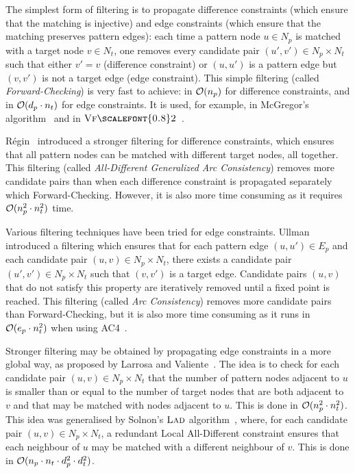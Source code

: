 \documentclass{llncs}
\newcommand{\VFtwo}{$\textsc{Vf{\scalefont{0.8}2}}$\xspace}
\newcommand{\LAD}{$\textsc{Lad}$\xspace}
\begin{document}
The simplest form of filtering is to propagate difference constraints (which ensure that the
matching is injective) and edge constraints (which ensure that the matching preserves pattern
edges): each time a pattern node $u\in N_p$ is matched with a target node $v\in N_t$, one removes
every candidate pair $(u',v')\in N_p\times N_t$ such that either $v'=v$ (difference constraint) or
$(u,u')$ is a pattern edge but $(v,v')$ is not a target edge (edge constraint). This simple
filtering (called \emph{Forward-Checking}) is very fast to achieve: in ${\cal O}(n_p)$ for
difference constraints, and in ${\cal O}(d_p\cdot n_t)$ for edge constraints. It is used, for
example, in McGregor's algorithm~\cite{mcgregor79} and in \VFtwo{}~\cite{Cordella:2004}.

R\'egin~\cite{regin} introduced a stronger filtering for difference constraints, which ensures that
all pattern nodes can be matched with different target nodes, all together. This filtering (called
\emph{All-Different Generalized Arc Consistency}) removes more candidate pairs than when each
difference constraint is propagated separately which Forward-Checking. However, it is also more time
consuming as it requires ${\cal O}(n_p^2\cdot n_t^2)$ time.

Various filtering techniques have been tried for edge constraints. Ullman~\cite{ullman} introduced a
filtering which ensures that for each pattern edge $(u,u')\in E_p$ and each candidate pair $(u,v)\in
N_p\times N_t$, there exists a candidate pair $(u',v')\in N_p\times N_t$ such that $(v,v')$ is a
target edge. Candidate pairs $(u,v)$ that do not satisfy this property are iteratively removed
until a fixed point is reached. This filtering (called \emph{Arc Consistency}) removes more
candidate pairs than Forward-Checking, but it is also more time consuming as it
runs in ${\cal
O}(e_p\cdot n_t^2)$ when using AC4~\cite{MH86}.

Stronger filtering may be obtained by propagating edge constraints in a more global way, as proposed
by Larrosa and Valiente~\cite{LV02}. The idea is to check for each candidate pair $(u,v)\in
N_p\times N_t$ that the number of pattern nodes adjacent to $u$ is smaller than or equal to the
number of target nodes that are both adjacent to $v$ and that may be matched with nodes adjacent to
$u$. This is done in ${\cal O}(n_p^2\cdot n_t^2)$. This idea was generalised by
Solnon's \LAD algorithm~\cite{Solnon:2010}, where, for each candidate pair $(u,v)\in N_p\times N_t$, a redundant Local
All-Different constraint ensures that each neighbour of $u$ may be matched with a different
neighbour of $v$. This is done in ${\cal O}(n_p\cdot n_t\cdot d_p^2\cdot d_t^2)$.
\end{document}
